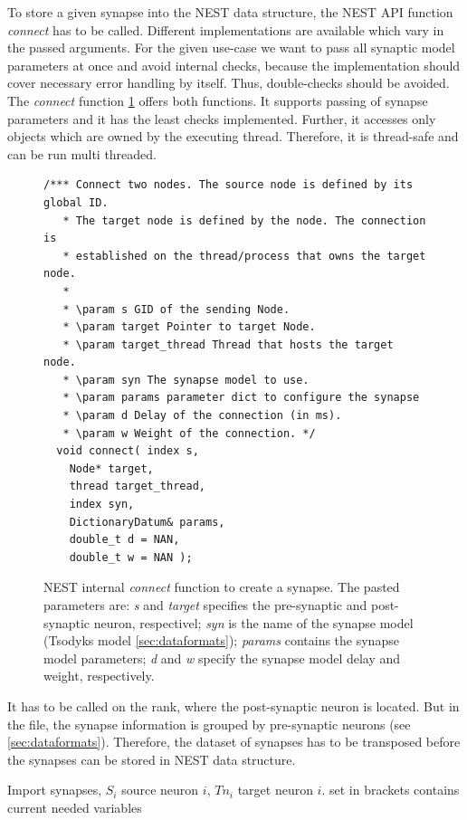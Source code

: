 To store a given synapse into the NEST data structure,
the NEST API function \emph{connect} has to be called.  
Different implementations are available which vary in the passed arguments.
For the given use-case we want to pass all synaptic model parameters at once and
avoid internal checks, because the implementation should cover necessary error handling by 
itself. Thus, double-checks should be avoided.
The \emph{connect} function \ref{code:connect} offers both functions.
It supports passing of synapse parameters and it has the least checks implemented.
Further, it accesses only objects which are owned by the executing thread. 
Therefore, it is thread-safe and can be run multi threaded.
\begin{figure}[ht!]
\begin{lstlisting}[style=cppcode]
/*** Connect two nodes. The source node is defined by its global ID.
   * The target node is defined by the node. The connection is
   * established on the thread/process that owns the target node.
   *
   * \param s GID of the sending Node.
   * \param target Pointer to target Node.
   * \param target_thread Thread that hosts the target node.
   * \param syn The synapse model to use.
   * \param params parameter dict to configure the synapse
   * \param d Delay of the connection (in ms).
   * \param w Weight of the connection. */
  void connect( index s,
    Node* target,
    thread target_thread,
    index syn,
    DictionaryDatum& params,
    double_t d = NAN,
    double_t w = NAN );
\end{lstlisting}
\caption{NEST internal \emph{connect} function to create a synapse. The pasted parameters are:
\emph{s} and \emph{target} specifies the pre-synaptic and post-synaptic neuron, respectivel;
\emph{syn} is the name of the synapse model (Tsodyks model \ref{sec:dataformats});
\emph{params} contains the synapse model parameters;
\emph{d} and \emph{w} specify the synapse model delay and weight, respectively.}
\label{code:connect}
\end{figure}
It has to be called on the rank, where the post-synaptic neuron is located.
But in the file, the synapse information is grouped by pre-synaptic neurons (see \ref{sec:dataformats}).
Therefore, the dataset of synapses has to be transposed before the synapses can be stored in NEST data structure.
\begin{algorithm}[ht!]
	\caption{Import synapses, $S_i$ source neuron $i$, $Tn_i$ target neuron $i$.
	set in brackets contains current needed variables}
\label{alg2}
\end{algorithm}
